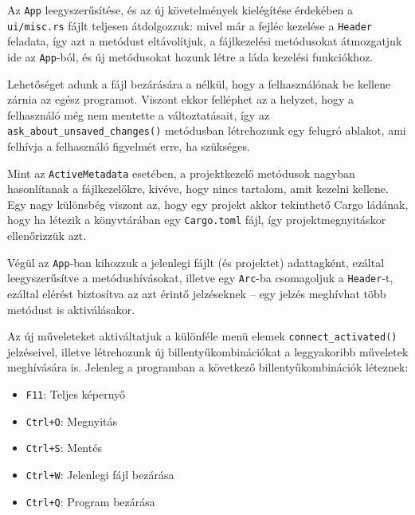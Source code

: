 
Az \texttt{App} leegyszerűsítése, és az új követelmények kielégítése érdekében a \texttt{ui/misc.rs}
fájlt teljesen átdolgozzuk: mivel már a fejléc kezelése a \texttt{Header} feladata,
így azt a metódust eltávolítjuk, a fájlkezelési metódusokat átmozgatjuk ide az \texttt{App}-ból,
és új metódusokat hozunk létre a láda kezelési funkciókhoz.



Lehetőséget adunk a fájl bezárására a nélkül, hogy a felhasználónak be kellene zárnia az egész programot.
Viszont ekkor felléphet az a helyzet, hogy a felhasználó még nem mentette a változtatásait,
így az \texttt{ask\_about\_unsaved\_changes()} metódusban létrehozunk egy felugró ablakot,
ami felhívja a felhasználó figyelmét erre, ha szükséges.

Mint az \texttt{ActiveMetadata} esetében, a projektkezelő metódusok nagyban hasonlítanak a fájlkezelőkre,
kivéve, hogy nincs tartalom, amit kezelni kellene.
Egy nagy különsbég viszont az, hogy egy projekt akkor tekinthető Cargo ládának, hogy ha létezik a
könyvtárában egy \texttt{Cargo.toml} fájl, így projektmegnyitáskor ellenőrizzük azt.

Végül az \texttt{App}-ban kihozzuk a jelenlegi fájlt (és projektet) adattagként, 
ezáltal leegyszerűsítve a metódushívásokat, illetve egy \texttt{Arc}-ba csomagoljuk
a \texttt{Header}-t, ezáltal elérést biztosítva az azt érintő jelzéseknek --
egy jelzés meghívhat több metódust is aktiválásakor.



Az új műveleteket aktiváltatjuk a különféle menü elemek \texttt{connect\_activated()} jelzéseivel,
illetve létrehozunk új billentyűkombinációkat a leggyakoribb műveletek meghívására is.
Jelenleg a programban a következő billentyűkombinációk léteznek:

\begin{itemize}
    \item \texttt{F11}: Teljes képernyő
    \item \texttt{Ctrl+O}: Megnyitás
    \item \texttt{Ctrl+S}: Mentés
    \item \texttt{Ctrl+W}: Jelenlegi fájl bezárása
    \item \texttt{Ctrl+Q}: Program bezárása
\end{itemize}

